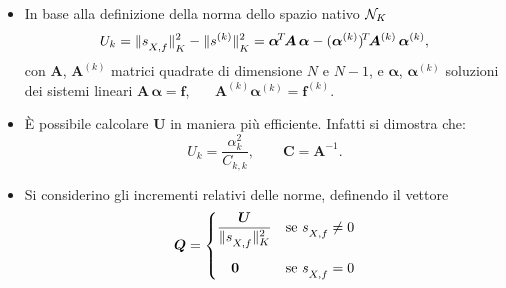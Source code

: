 \documentclass[10pt]{beamer}
\theoremstyle{definition}
\theoremstyle{plain}
\def\Cal#1{{\cal #1}}
\def\norm#1{\Vert #1\Vert}
\def\hbyw#1#2{\vbox to #1{\vfil \hbox to #2{\hfil}}}
\def\lK{{\lower.5ex\hbox{$\scriptstyle K$}}}
\def\lXf{{\lower.5ex\hbox{$\scriptstyle X, f$}}}
\begin{document}
\begin{frame}
\begin{itemize}
\item In base alla definizione della norma dello spazio nativo $\Cal N_K$
$$
U_k = \norm{s_\lXf}^2_\lK - \norm{s^{(k)}}^2_\lK = \bm \alpha^{\!T\!}\bm A\,\bm\alpha - (\bm\alpha^{(k)})^{\!T\!}\bm A^{(k)}\,\bm\alpha^{(k)},
$$
con $\bm A$,  $\bm A^{(k)}$ matrici quadrate di dimensione $N$ e $N-1$, e $\bm\alpha$, $\bm\alpha^{(k)}$ soluzioni dei sistemi lineari $\bm A\,\bm\alpha =\bm f$, \ $\quad \bm A^{(k)} \bm\alpha^{(k)} = \bm f^{(k)}$.


\smallskip

\item
È possibile calcolare $\bm U$ in maniera più efficiente.  Infatti si dimostra che:
$$
U_k = \frac{\alpha_k^2}{C_{k,k}}, \qquad \bm C = \bm A^{-1}.
$$

\smallskip

\item
Si considerino gli incrementi relativi delle norme, definendo il vettore
$$
\bm Q = \begin{cases}\displaystyle
			\frac{\bm U}{\norm{s_\lXf}^2_K} & \text{se $s_\lXf \neq 0$}\\
			\hbyw{4ex}{1em}\bm 0 & \text{se $s_\lXf = 0$}
	       \end{cases}
$$


\end{itemize}
\end{frame}
\end{document}
